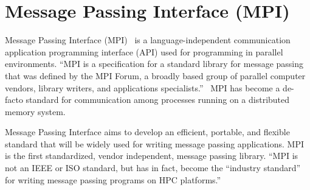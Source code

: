 \section{Message Passing Interface (MPI)}
Message Passing Interface (MPI)~\cite{mpi} is a language-independent communication application programming interface (API) used for programming in parallel environments. ``MPI is a specification for a standard library for message passing that was defined by the MPI Forum, a broadly based group of parallel computer vendors, library writers, and applications specialists.''~\cite{gropp1996high} MPI has become a de-facto standard for communication among processes running on a distributed memory system.

Message Passing Interface aims to develop an efficient, portable, and flexible standard that will be widely used for writing message passing applications. MPI is the first standardized, vendor independent, message passing library. ``MPI is not an IEEE or ISO standard, but has in fact, become the ``industry standard'' for writing message passing programs on HPC platforms.''~\cite{barker2015message}

